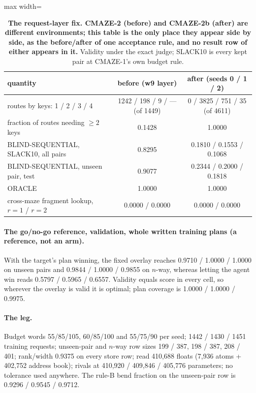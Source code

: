 \documentclass{article} %
\begin{document}
\begin{table}[h]
\centering\small
\caption{\textbf{The request-layer fix. CMAZE-2 (before) and CMAZE-2b (after) are different
environments; this table is the only place they appear side by side, as the before/after of one
acceptance rule, and no result row of either appears in it.} Validity under the exact judge;
SLACK10 is every kept pair at CMAZE-1's own budget rule.}
\label{tab:req}
\setlength{\tabcolsep}{3pt}
\begin{adjustbox}{max width=\linewidth}\begin{tabular}{lcc}
\toprule
quantity & before (w9 layer) & after (seeds 0 / 1 / 2) \\
\midrule
routes by keys: 1 / 2 / 3 / 4 & 1242 / 198 / 9 / --- (of 1449) & 0 / 3825 / 751 / 35 (of 4611) \\
fraction of routes needing $\ge2$ keys & 0.1428 & 1.0000 \\
BLIND-SEQUENTIAL, SLACK10, all pairs & 0.8295 & 0.1810 / 0.1553 / 0.1068 \\
BLIND-SEQUENTIAL, unseen pair, test & 0.9077 & 0.2344 / 0.2000 / 0.1818 \\
ORACLE & 1.0000 & 1.0000 \\
cross-maze fragment lookup, $r=1$ / $r=2$ & 0.0000 / 0.0000 & 0.0000 / 0.0000 \\
\bottomrule
\end{tabular}\end{adjustbox}
\end{table}



\paragraph{The go/no-go reference, validation, whole written training plans (a reference, not an
arm).} With the target's plan winning, the fixed overlay reaches 0.9710 / 1.0000 / 1.0000 on unseen
pairs and 0.9844 / 1.0000 / 0.9855 on $n$-way, whereas letting the agent win reads 0.5797 / 0.5965 /
0.6557. Validity equals score in every cell, so wherever the overlay is valid it is optimal; plan
coverage is 1.0000 / 1.0000 / 0.9975. %

\paragraph{The leg.} Budget words 55/85/105, 60/85/100 and 55/75/90 per seed; 1442 / 1430 / 1451
training requests; unseen-pair and $n$-way row sizes 199 / 387, 198 / 387, 208 / 401; rank/width
0.9375 on every store row; read 410,688 floats (7,936 atoms + 402,752 address book); rivals at
410,920 / 409,846 / 405,776 parameters; no tolerance used anywhere. The rule-B bend fraction on the
unseen-pair row is 0.9296 / 0.9545 / 0.9712. %
\end{document}
